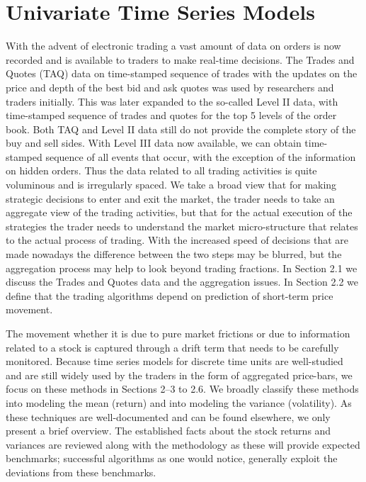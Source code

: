 
\chapter{Univariate Time Series Models}

With the advent of electronic trading a vast amount of data on orders is now recorded and is available to traders to make real-time decisions. The Trades and Quotes (TAQ) data on time-stamped sequence of trades with the updates on the price and depth of the best bid and ask quotes was used by researchers and traders initially. This was later expanded to the so-called Level II data, with time-stamped sequence of trades and quotes for the top 5 levels of the order book. Both TAQ and Level II data still do not provide the complete story of the buy and sell sides. With Level III data now available, we can obtain time-stamped sequence of all events that occur, with the exception of the information on hidden orders. Thus the data related to all trading activities is quite voluminous and is irregularly spaced. We take a broad view that for making strategic decisions to enter and exit the market, the trader needs to take an aggregate view of the trading activities, but that for the actual execution of the strategies the trader needs to understand the market micro-structure that relates to the actual process of trading. With the increased speed of decisions that are made nowadays the difference between the two steps may be blurred, but the aggregation process may help to look beyond trading fractions. In Section 2.1 we discuss the Trades and Quotes data and the aggregation issues. In Section 2.2 we define that the trading algorithms depend on prediction of short-term price movement.


The movement whether it is due to pure market frictions or due to information related to a stock is captured through a drift term that needs to be carefully monitored. Because time series models for discrete time units are well-studied and are still widely used by the traders in the form of aggregated price-bars, we focus on these methods in Sections 2--3 to 2.6. We broadly classify these methods into modeling the mean (return) and into modeling the variance (volatility). As these techniques are well-documented and can be found elsewhere, we only present a brief overview. The established facts about the stock returns and variances are reviewed along with the methodology as these will provide expected benchmarks; successful algorithms as one would notice, generally exploit the deviations from these benchmarks.


